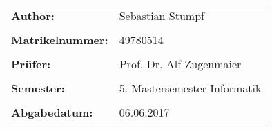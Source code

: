 \bigskip \bigskip \bigskip 
\vspace*{0.8cm}
\bigskip
\vfill

\begin{tabular}{ll}
{\Large \textbf{Author:}} & {\Large Sebastian Stumpf} \\\\
{\Large \textbf{Matrikelnummer:}} & {\Large 49780514} \\\\
{\Large \textbf{Prüfer:}} & {\Large Prof. Dr. Alf Zugenmaier} \\\\
{\Large \textbf{Semester:}} & {\Large 5. Mastersemester Informatik} \\\\
{\Large \textbf{Abgabedatum:}} & {\Large 06.06.2017}
\end{tabular}
